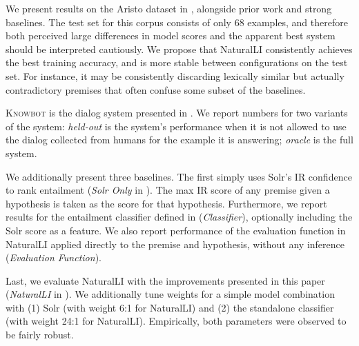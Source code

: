 %
%
We present results on the Aristo dataset in ,
  alongside prior work and strong baselines.
The test set for this corpus consists of only 68 examples,
  and therefore both perceived large differences in model scores 
  and the apparent best system should be interpreted cautiously.
We propose that NaturalLI consistently achieves the best training accuracy,
  and is more stable between configurations on the test set.
For instance,
  it may be consistently discarding lexically similar but actually contradictory
  premises that often confuse some subset of the baselines.

\textsc{Knowbot} is the dialog system presented in 
  .
We report numbers for two variants of the system:
  \textit{held-out} is the system's performance when it is not allowed
  to use the dialog collected from humans for the example it is answering;
  \textit{oracle} is the full system.

We additionally present three baselines.
The first simply uses Solr's IR confidence to rank
  entailment (\textit{Solr Only} in ).
The max IR score of any premise given a hypothesis is taken
  as the score for that hypothesis.
Furthermore, we report results for the entailment classifier defined
  in  (\textit{Classifier}), optionally
  including the Solr score as a feature.
We also report performance of the evaluation function in NaturalLI
  applied directly to the premise and hypothesis, without any inference
  (\textit{Evaluation Function}).

Last, we evaluate NaturalLI with the improvements presented in this paper
  (\textit{NaturalLI} in ).
We additionally tune weights for a 
  simple model combination with
  (1) Solr (with weight 6:1 for NaturalLI) and 
  (2) the standalone classifier (with weight 24:1 for NaturalLI).
Empirically, both parameters were observed to be fairly robust.


